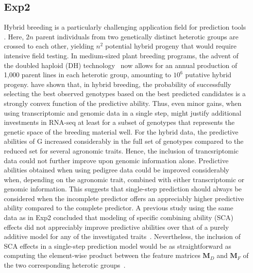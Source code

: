 \documentclass[12pt,titlepage]{article}
\begin{document}
\subsection{Exp2}
Hybrid breeding is a particularly challenging application field for prediction
tools \cite{Kadam2016}.
Here, $2n$ parent individuals from two genetically distinct heterotic groups are
crossed to each other, yielding $n^{2}$ potential hybrid progeny that would
require intensive field testing.
In medium-sized plant breeding programs, the advent of the doubled haploid (DH) 
technology~\cite{Wedzony2009} now allows for an annual production of 1,000 
parent lines in each heterotic group, amounting to $10^{6}$ putative hybrid
progeny.
 have shown that, in hybrid breeding, the probability 
of successfully selecting the best observed genotypes based on the best 
predicted candidates is a strongly convex function of the predictive ability.
Thus, even minor gains, when using transcriptomic and genomic data in a
single step, might justify additional investments in RNA-seq at least for a
subset of genotypes that represents the genetic space of the breeding 
material well.
For the hybrid data, the predictive abilities of G increased considerably in the
full set of genotypes compared to the reduced set for several agronomic traits.
Hence, the inclusion of trancsriptomic data could not further improve upon
genomic information alone.
Predictive abilities obtained when using pedigree data could be 
improved considerably when, depending on the agronomic trait, combined with 
either transcriptomic or genomic information.
This suggests that single-step prediction should always be considered when the
incomplete predictor offers an appreciably higher predictive ability compared
to the complete predictor.
A previous study using the same data as in Exp2 concluded that modeling of
specific combining ability (SCA) effects did not appreciably improve predictive
abilities over that of a purely additive model for any of the investigated
traits~\cite{Westhues2017}.
Nevertheless, the inclusion of SCA effects in a single-step prediction model
would be as straightforward as computing the element-wise product between the
feature matrices $\mathbf{M}_{D}$ and $\mathbf{M}_{F}$ of the two corresponding
heterotic groups~\cite{Martini2016}.
\end{document}
